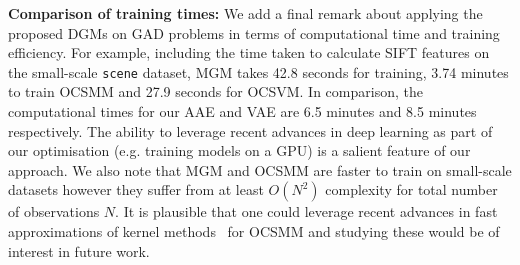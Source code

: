 {\bf Comparison of training times:}
\label{sec:runtime}
We add a final remark about applying the proposed DGMs on  GAD problems in terms of computational time and training efficiency.
For example, including the time taken to calculate SIFT features on the small-scale {\tt scene} dataset, MGM takes 42.8 seconds for training, 3.74 minutes to train OCSMM and 27.9 seconds for OCSVM. In comparison, the computational times for our AAE and VAE are  6.5 minutes and 8.5 minutes respectively. %
 The ability to leverage recent advances in deep learning as part of our optimisation (e.g. training models on a GPU) is  a salient feature of our approach. We also note that MGM and OCSMM are faster to train on small-scale datasets however they suffer from at least $O(N^2)$ complexity for total number of observations $N$. %
It is plausible that one could leverage recent advances in fast approximations of kernel methods~\cite{Lopez-Paz:2014} for OCSMM and studying these would be of interest in future work.









